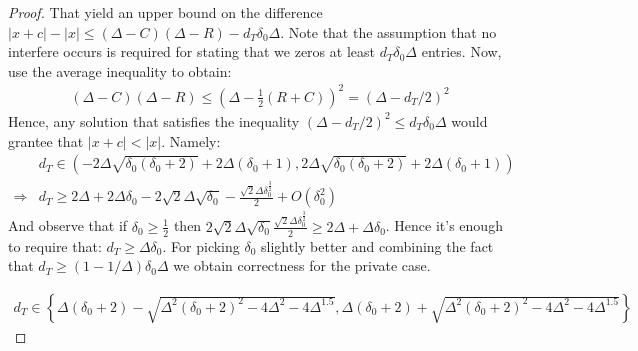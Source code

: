 \begin{proof}
That yield an upper bound on the difference $|x +c| - |x| \le  \left( \Delta -C \right) \left( \Delta -R \right) -  d_{T}\delta_{0}\Delta $. Note that the assumption that no interfere occurs is required for stating that we zeros at least $d_{T}\delta_{0}\Delta$ entries. Now, use the average inequality to obtain:   
\begin{equation*}
  \begin{split}
    \left( \Delta -C \right) \left( \Delta -R \right)  \le \left( \Delta - \frac{1}{2}\left( R+C \right)  \right)^{2}   = \left( \Delta - d_{T}/2 \right)^{2}
  \end{split}
\end{equation*}
Hence, any solution that satisfies the inequality $ \left( \Delta -d_{T}/2  \right)^{2} \le d_{T}\delta_{0}\Delta $ would grantee that $|x +c| < |x|$. Namely:
\begin{equation*}
  \begin{split}
   & d_{T} \in \left( - 2 \Delta \sqrt{\delta_{0} \left(\delta_{0} + 2\right)} + 2 \Delta \left(\delta_{0} + 1\right), 2 \Delta \sqrt{\delta_{0} \left(\delta_{0} + 2\right)} + 2 \Delta \left(\delta_{0} + 1\right)\right) \\
  \Rightarrow &  d_{T} \ge 2 \Delta + 2 \Delta \delta_{0} - 2 \sqrt{2} \Delta \sqrt{\delta_{0}} - \frac{\sqrt{2} \Delta \delta_{0}^{\frac{3}{2}}}{2} + O\left(\delta_{0}^{2}\right)
  \end{split}
\end{equation*}
And observe that if $\delta_{0} \ge \frac{1}{2}$ then $  2 \sqrt{2} \Delta \sqrt{\delta_{0}}  \frac{\sqrt{2} \Delta \delta_{0}^{\frac{3}{2}}}{2} \ge 2\Delta + \Delta\delta_{0}$. Hence it's enough to require that: $d_{T} \ge \Delta \delta_{0}$. For picking $\delta_{0}$ slightly better and combining the fact that $d_{T} \ge \left( 1 - 1/\Delta \right)\delta_{0}\Delta$ we obtain correctness for the private case.  

%
%
%
%

\begin{equation*}
  \begin{split}
    d_{T} \in  \left\{\Delta \left(\delta_{0} + 2\right) - \sqrt{\Delta^{2} \left(\delta_{0} + 2\right)^{2} - 4 \Delta^{2} - 4 \Delta^{1.5}}, \Delta \left(\delta_{0} + 2\right) + \sqrt{\Delta^{2} \left(\delta_{0} + 2\right)^{2} - 4 \Delta^{2} - 4 \Delta^{1.5}}\right\}
  \end{split}
\end{equation*}


\end{proof}
